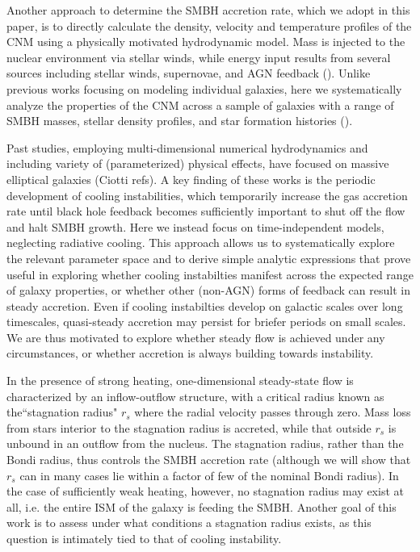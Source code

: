 \documentclass[usenatbib,fleqn]{mn2e}
\newcommand{\rs}{r_s}
\begin{document}
Another approach to determine the SMBH accretion rate, which we adopt in this paper, is to directly calculate the density, velocity and temperature profiles of the CNM using a physically motivated
hydrodynamic model.  Mass is injected to the nuclear environment via
stellar winds, while energy input results from several sources including stellar winds, supernovae, and AGN feedback (\citealt{Quataert:2004a,De-ColleGuillochon+:2012a,ShcherbakovWong+:2014a}).  Unlike previous works focusing on modeling individual galaxies, here we systematically analyze the properties of the CNM across a sample of galaxies with a range of SMBH masses, stellar density profiles, and star formation histories (\citealt{WangMerritt:2004a}).  

Past studies, employing multi-dimensional numerical hydrodynamics and including variety of (parameterized) physical effects, have focused on massive elliptical galaxies (Ciotti refs).  A key finding of these works is the periodic development of cooling instabilities, which temporarily increase the gas accretion rate until black hole feedback becomes sufficiently important to shut off the flow and halt SMBH growth.  Here we instead focus on time-independent models, neglecting radiative cooling.  This approach allows us to systematically explore the relevant parameter space and to derive simple analytic expressions that prove useful in exploring whether cooling instabilties manifest across the expected range of galaxy properties, or whether other (non-AGN) forms of feedback can result in steady accretion.  Even if cooling instabilties develop on galactic scales over long timescales, quasi-steady accretion may persist for briefer periods on small scales.  We are thus motivated to explore whether steady flow is achieved under any circumstances, or whether accretion is always building towards instability.  

In the presence of strong heating, one-dimensional steady-state flow is characterized by an inflow-outflow structure, with a critical radius known as the``stagnation radius" $\rs$ where the radial velocity passes through zero.  Mass loss from stars interior to the stagnation radius is accreted, while that outside $\rs$ is unbound in an outflow from the nucleus.  The stagnation radius, rather than the Bondi radius, thus controls the SMBH accretion rate (although we will show that $\rs$ can in many cases lie within a factor of few of the nominal Bondi radius).  In the case of sufficiently weak heating, however, no stagnation radius may exist at all, i.e. the entire ISM of the galaxy is feeding the SMBH.  Another goal of this work is to assess under what conditions a stagnation radius exists, as this question is intimately tied to that of cooling instability.  
\end{document}
